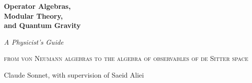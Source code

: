 \begin{titlepage}
\thispagestyle{empty}
\null\vspace{0.16\textheight}
\begin{flushleft}
{\fontsize{34}{40}\selectfont\bfseries Operator Algebras,\\[2pt] Modular Theory,\\[2pt] and Quantum Gravity\par}
\vspace{1.4em}
{\Large\itshape A Physicist's Guide\par}
\vspace{2.2em}
\textsc{from von Neumann algebras to the algebra of observables of de Sitter space}
\vspace{2.6em}
{\large Claude Sonnet, with supervision of Saeid Aliei\par}
\end{flushleft}
\vfill
\end{titlepage}
